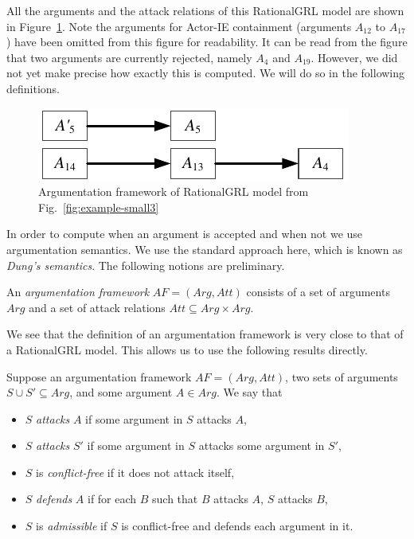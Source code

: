 All the arguments and the attack relations of this RationalGRL model are shown in Figure~\ref{fig:example-small4}. Note the arguments for Actor-IE containment (arguments $A_{12}$ to $A_{17}$) have been omitted from this figure for readability. It can be read from the figure that two arguments are currently rejected, namely $A_4$ and $A_{19}$. However, we did not yet make precise how exactly this is computed. We will do so in the following definitions.

\begin{figure}[ht]
\centering
\includegraphics[width=\columnwidth]{img/Example1-new-arguments}
\caption{Argumentation framework of RationalGRL model from Fig.~\ref{fig:example-small3}}
\label{fig:example-small4}
\end{figure} 


In order to compute when an argument is accepted and when not we use argumentation semantics.  We use the standard approach here, which is known as \emph{Dung's semantics}. The following notions are preliminary.

\begin{definition}
\label{def:argumentation-framework}
An \emph{argumentation framework} $AF=(Arg,Att)$ consists of a set of arguments $Arg$ and a set of attack relations $Att\subseteq Arg\times Arg.$
\end{definition}

We see that the definition of an argumentation framework is very close to that of a RationalGRL model. This allows us to use the following results directly.

\begin{definition} Suppose an argumentation framework $AF=(Arg,Att)$, two sets of arguments $S\cup S'\subseteq Arg$, and some argument $A\in Arg$. We say that
\begin{itemize}
\item $S$ \emph{attacks} $A$ if some argument in $S$ attacks $A$,
\item $S$ \emph{attacks} $S'$ if some argument in $S$ attacks some argument in $S'$,
\item $S$ is \emph{conflict-free} if it does not attack itself,
\item $S$ \emph{defends} $A$ if for each $B$ such that $B$ attacks $A$, $S$ attacks $B$,
\item $S$ is \emph{admissible} if $S$ is conflict-free and defends each argument in it.
\end{itemize}
\end{definition}

